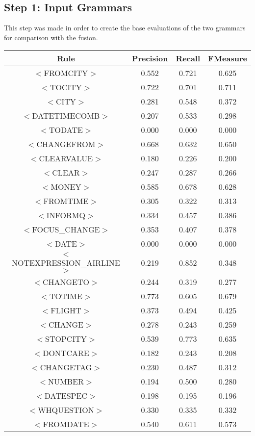 \documentclass[a4paper,10pt]{article}
\begin{document}
\subsection{Step 1: Input Grammars}
This step was made in order to create the base evaluations of the two grammars for comparison with the fusion.

 \label{tab:title} 
\begin{center}
\begin{tabular}{|c||c|c|c|}
\hline
Rule&Precision&Recall&FMeasure\\
\hline
\hline
$<$FROMCITY$>$&0.552&0.721&0.625 \\
\hline$<$TOCITY$>$&0.722&0.701&0.711 \\
\hline$<$CITY$>$&0.281&0.548&0.372 \\
\hline$<$DATETIMECOMB$>$&0.207&0.533&0.298 \\
\hline$<$TODATE$>$&0.000&0.000&0.000 \\
\hline$<$CHANGEFROM$>$&0.668&0.632&0.650 \\
\hline$<$CLEARVALUE$>$&0.180&0.226&0.200 \\
\hline$<$CLEAR$>$&0.247&0.287&0.266 \\
\hline$<$MONEY$>$&0.585&0.678&0.628 \\
\hline$<$FROMTIME$>$&0.305&0.322&0.313 \\
\hline$<$INFORMQ$>$&0.334&0.457&0.386 \\
\hline$<$FOCUS\_CHANGE$>$&0.353&0.407&0.378 \\
\hline$<$DATE$>$&0.000&0.000&0.000 \\
\hline$<$NOTEXPRESSION\_AIRLINE$>$&0.219&0.852&0.348 \\
\hline$<$CHANGETO$>$&0.244&0.319&0.277 \\
\hline$<$TOTIME$>$&0.773&0.605&0.679 \\
\hline$<$FLIGHT$>$&0.373&0.494&0.425 \\
\hline$<$CHANGE$>$&0.278&0.243&0.259 \\
\hline$<$STOPCITY$>$&0.539&0.773&0.635 \\
\hline$<$DONTCARE$>$&0.182&0.243&0.208 \\
\hline$<$CHANGETAG$>$&0.230&0.487&0.312 \\
\hline$<$NUMBER$>$&0.194&0.500&0.280 \\
\hline$<$DATESPEC$>$&0.198&0.195&0.196 \\
\hline$<$WHQUESTION$>$&0.330&0.335&0.332 \\
\hline$<$FROMDATE$>$&0.540&0.611&0.573 \\

\end{tabular}
\end{center}
\end{document}
